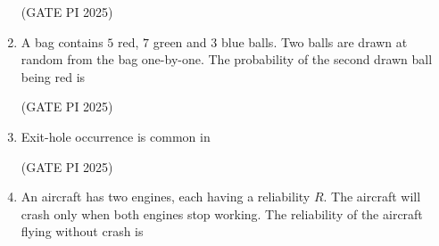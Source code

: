 \documentclass[journal,12pt,onecolumn]{IEEEtran}
\theoremstyle{remark}
\begin{document}
\begin{enumerate}
\begin{enumerate}
\end{enumerate}

\hfill (GATE PI 2025)

\item A bag contains $5$ red, $7$ green and $3$ blue balls. Two balls are drawn at random from the bag one-by-one. The probability of the second drawn ball being red is

\begin{enumerate}
\end{enumerate}

\hfill (GATE PI 2025)

\item Exit-hole occurrence is common in

\begin{enumerate}
\end{enumerate}

\hfill (GATE PI 2025)

\item An aircraft has two engines, each having a reliability $R$. The aircraft will crash only when both engines stop working. The reliability of the aircraft flying without crash is

\begin{enumerate}
\end{enumerate}


\end{enumerate}
\end{document}
